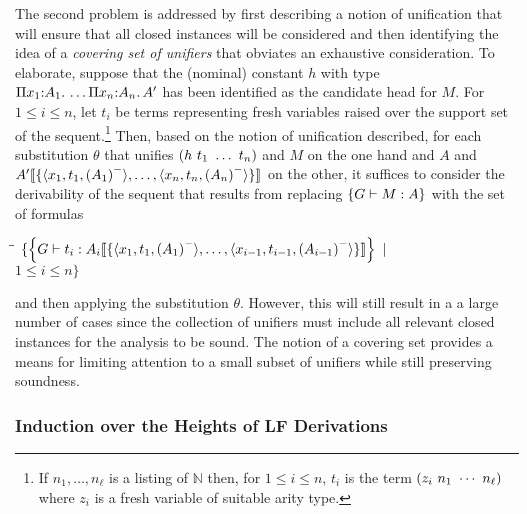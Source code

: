 The second problem is addressed by first describing a notion
of unification that will ensure that all closed instances will be
considered and then identifying the idea of a \emph{covering set of
unifiers} that obviates an exhaustive consideration.
%
To elaborate, suppose that the (nominal) constant $h$ with
type $\typedpi{x_1}{A_1}{\ldots\typedpi{x_n}{A_n}{A'}}$ has been
identified  as the candidate head for $M$.
%
For $1\leq i \leq n$, let $t_i$ be terms representing fresh
variables raised over the support set of the sequent.\footnote{If
  $n_1,\ldots,n_{\ell}$ is a listing of $\mathbb{N}$ then, for $1 \leq
  i \leq n$, $t_i$ is the term $(z_i\app n_1\app \cdots\app n_{\ell})$
  where $z_i$ is a fresh variable of suitable arity type.}
%
Then, based on the notion of unification described, for each
substitution $\theta$ that unifies 
$(h\app t_1\app\ldots\app t_n)$ and $M$ on the one hand and $A$ and
$\hsubst{\{\langle x_1,t_1,\erase{A_1} \rangle,
  \ldots,\langle x_n,t_n,\erase{A_n}\rangle\}}{A'}$ on the other, 
it suffices to consider the derivability of the sequent that results
from replacing $\fatm{G}{M:A}$ with the set of
formulas 
\begin{tabbing}
\quad\=\qquad\qquad\qquad\qquad\qquad\=\kill
\>$\{\fatm{G}{t_i : \hsubst{\{\langle x_1,t_1,\erase{A_1} \rangle,
  \ldots,\langle
  x_{i-1},t_{i-1},\erase{A_{i-1}}\rangle\}}{A_i}}\ \vert$\\
\>\>$1 \leq i \leq n\}$
\end{tabbing}
and then applying the substitution $\theta$.
%
However, this will still result in a a large number of cases since the
collection of unifiers must include all relevant closed instances for
the analysis to be sound.
%
The notion of a covering set provides a means for limiting attention
to a small subset of unifiers while still preserving soundness.

\subsubsection{Induction over the Heights of LF Derivations}

